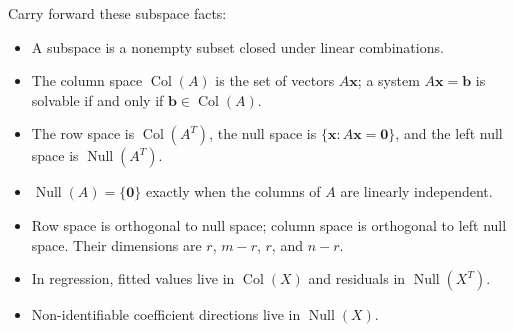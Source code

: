 Carry forward these subspace facts:
\begin{itemize}
    \item A subspace is a nonempty subset closed under linear combinations.
    \item The column space \(\operatorname{Col}(A)\) is the set of vectors \(A\mathbf{x}\); a system \(A\mathbf{x}=\mathbf{b}\) is solvable if and only if \(\mathbf{b}\in\operatorname{Col}(A)\).
    \item The row space is \(\operatorname{Col}(A^T)\), the null space is \(\{\mathbf{x}:A\mathbf{x}=\mathbf{0}\}\), and the left null space is \(\operatorname{Null}(A^T)\).
    \item \(\operatorname{Null}(A)=\{\mathbf{0}\}\) exactly when the columns of \(A\) are linearly independent.
    \item Row space is orthogonal to null space; column space is orthogonal to left null space. Their dimensions are \(r\), \(m-r\), \(r\), and \(n-r\).
    \item In regression, fitted values live in \(\operatorname{Col}(X)\) and residuals in \(\operatorname{Null}(X^T)\).
    \item Non-identifiable coefficient directions live in \(\operatorname{Null}(X)\).
\end{itemize}
